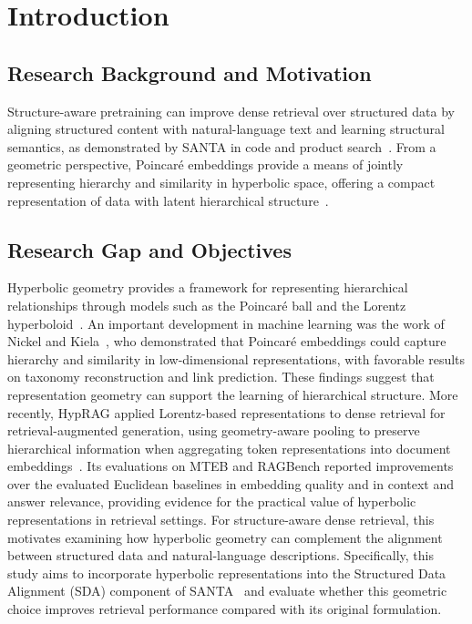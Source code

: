 \newpage

\section{Introduction}
\label{sec:01_introduction}

\subsection{Research Background and Motivation}
Structure-aware pretraining can improve dense retrieval over structured data by aligning structured content with natural-language text and learning structural semantics, as demonstrated by SANTA in code and product search~\cite{li2023structure}.
From a geometric perspective, Poincar\'e embeddings provide a means of jointly representing hierarchy and similarity in hyperbolic space, offering a compact representation of data with latent hierarchical structure~\cite{nickel2017poincare}.

\subsection{Research Gap and Objectives}
Hyperbolic geometry provides a framework for representing hierarchical relationships through models such as the Poincar\'e ball and the Lorentz hyperboloid~\cite{nickel2018learning}. An important development in machine learning was the work of Nickel and Kiela~\cite{nickel2017poincare}, who demonstrated that Poincar\'e embeddings could capture hierarchy and similarity in low-dimensional representations, with favorable results on taxonomy reconstruction and link prediction. These findings suggest that representation geometry can support the learning of hierarchical structure. More recently, HypRAG applied Lorentz-based representations to dense retrieval for retrieval-augmented generation, using geometry-aware pooling to preserve hierarchical information when aggregating token representations into document embeddings~\cite{madhu2026hyprag}. Its evaluations on MTEB and RAGBench reported improvements over the evaluated Euclidean baselines in embedding quality and in context and answer relevance, providing evidence for the practical value of hyperbolic representations in retrieval settings. For structure-aware dense retrieval, this motivates examining how hyperbolic geometry can complement the alignment between structured data and natural-language descriptions. Specifically, this study aims to incorporate hyperbolic representations into the Structured Data Alignment (SDA) component of SANTA~\cite{li2023structure} and evaluate whether this geometric choice improves retrieval performance compared with its original formulation.

